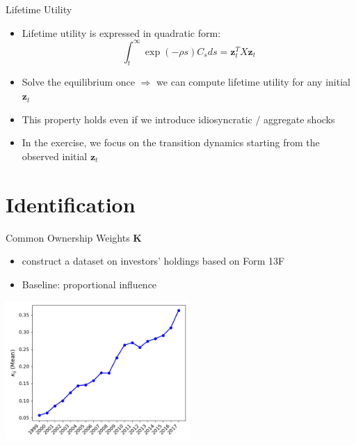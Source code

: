 \documentclass[
  10pt,
  aspectratio=169,   %
]{beamer}
\theoremstyle{plain}
\begin{document}
\begin{frame}{Lifetime Utility}

  \label{aggregation}
  \begin{itemize}
    \item Lifetime utility is expressed in quadratic form:
          \[
            \int_{t}^{\infty}\exp\left(-\rho s\right)C_{s}ds=\bm{z}_{t}^{T}X\bm{z}_{t}
          \]

          \hyperlink{X}{}
    \item Solve the equilibrium once $\Longrightarrow$ we can compute lifetime utility for any initial $\bm{z}_{t}$
    \medskip{}
    \item This property holds even if we introduce idiosyncratic / aggregate shocks
    \medskip{}
    \item In the exercise, we focus on the transition dynamics starting from the observed initial $\bm{z}_{t}$
  \end{itemize}
\end{frame}

\section{Identification}

\begin{frame}{Common Ownership Weights $\bm{K}$}
  \begin{itemize}
    \item \citet{Backus2021-yt} construct a dataset on investors' holdings based on Form 13F
    \item Baseline: \citet{Rotemberg1984-jz} proportional influence \hfill\hyperlink{rotemberg}{}
  \end{itemize}
  \begin{center}
    \includegraphics[width=7cm]{figures/kappa}
  \end{center}
\end{frame}
\end{document}
